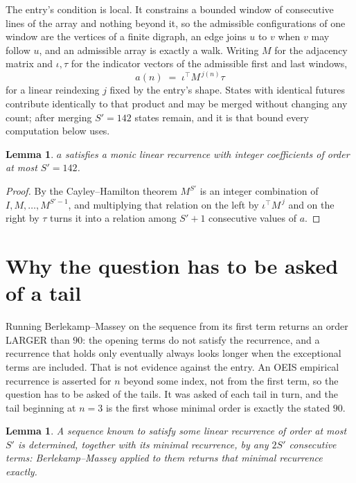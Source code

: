 \documentclass[11pt,a4paper]{article}
\theoremstyle{plain}
\newtheorem{lemma}[theorem]{Lemma}
\theoremstyle{definition}
\begin{document}
The entry's condition is local. It constrains a bounded window of consecutive lines of the
array and nothing beyond it, so the admissible configurations of one window are the vertices of
a finite digraph, an edge joins $u$ to $v$ when $v$ may follow $u$, and an admissible array is
exactly a walk. Writing $M$ for the adjacency matrix and $\iota,\tau$ for the indicator vectors
of the admissible first and last windows,
\[
a(n)\;=\;\iota^{\!\top}M^{\,j(n)}\tau
\]
for a linear reindexing $j$ fixed by the entry's shape. States with identical futures
contribute identically to that product and may be merged without changing any count; after
merging $S'=142$ states remain, and it is that bound every computation below uses.

\begin{lemma}\label{lem:cf}
$a$ satisfies a monic linear recurrence with integer coefficients of order at most $S'=142$.
\end{lemma}

\begin{proof}
By the Cayley--Hamilton theorem $M^{S'}$ is an integer combination of $I,M,\dots,M^{S'-1}$,
and multiplying that relation on the left by $\iota^{\!\top}M^{\,j}$ and on the right by
$\tau$ turns it into a relation among $S'+1$ consecutive values of $a$.
\end{proof}

\section{Why the question has to be asked of a tail}

Running Berlekamp--Massey on the sequence from its first term returns an order LARGER than $90$: the opening terms do not satisfy the recurrence, and a recurrence that holds only eventually always looks longer when the exceptional terms are included. That is not evidence against the entry. An OEIS empirical recurrence is asserted for $n$ beyond some index, not from the first term, so the question has to be asked of the tails. It was asked of each tail in turn, and the tail beginning at $n=3$ is the first whose minimal order is exactly the stated $90$.

\begin{lemma}\label{lem:bm}
A sequence known to satisfy some linear recurrence of order at most $S'$ is determined,
together with its minimal recurrence, by any $2S'$ consecutive terms: Berlekamp--Massey applied
to them returns that minimal recurrence exactly.
\end{lemma}
\end{document}
